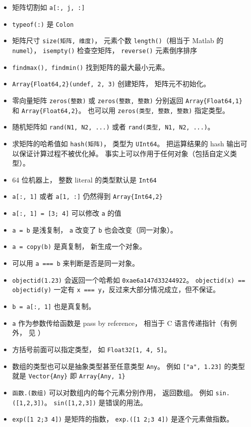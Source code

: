 \begin{itemize}
\item 矩阵切割如 \verb`a[:, j, :]`
\item \verb`typeof(:)` 是 \verb`Colon`
\item 矩阵尺寸 \verb`size(矩阵, 维度)`， 元素个数 \verb`length()`（相当于 Matlab 的 \verb`numel`）， \verb`isempty()` 检查空矩阵， \verb`reverse()` 元素倒序排序
\item \verb`findmax(), findmin()` 找到矩阵的最大最小元素。
\item \verb`Array{Float64,2}(undef, 2, 3)` 创建矩阵， 矩阵元不初始化。
\item 零向量矩阵 \verb`zeros(整数)` 或 \verb`zeros(整数, 整数)` 分别返回 \verb`Array{Float64,1}` 和 \verb`Array{Float64,2}`。 也可以用 \verb`zeros(类型, 整数, 整数)` 指定类型。
\item 随机矩阵如 \verb`rand(N1, N2, ...)` 或者 \verb`rand(类型, N1, N2, ...)`。
\item 求矩阵的哈希值如 \verb`hash(矩阵)`， 类型为 \verb`UInt64`。 把运算结果的 hash 输出可以保证计算过程不被优化掉。 事实上可以作用于任何对象（包括自定义类型）。
\item 64 位机器上， 整数 literal 的类型默认是 \verb`Int64`
\item \verb`a[:, 1]` 或者 \verb`a[1, :]` 仍然得到 \verb`Array{Int64,2}`
\item \verb`a[:, 1] = [3; 4]` 可以修改 \verb`a` 的值
\item \verb`a = b` 是浅复制， \verb`a` 改变了 \verb`b` 也会改变（同一对象）。
\item \verb`a = copy(b)` 是真复制， 新生成一个对象。
\item 可以用 \verb`a === b` 来判断是否是同一对象。
\item \verb`objectid(1.23)` 会返回一个哈希如 \verb`0xae6a147d33244922`。 \verb`objectid(x) == objectid(y)` 一定有 \verb`x === y`，反过来大部分情况成立，但不保证。
\item \verb`b = a[:, 1]` 也是真复制。
\item \verb`a` 作为参数传给函数是 pass by reference， 相当于 C 语言传递指针（有例外， 见 ）
\item 方括号前面可以指定类型， 如 \verb`Float32[1, 4, 5]`。
\item 数组的类型也可以是抽象类型甚至任意类型 \verb`Any`。 例如 \verb`["a", 1.23]` 的类型就是 \verb`Vector{Any}` 即 \verb`Array{Any, 1}`
\item \verb`函数.(数组)` 可以对数组内的每个元素分别作用， 返回数组。 例如 \verb`sin.([1,2,3])`。 \verb`sin([1,2,3])` 是错误的用法。
\item \verb`exp([1 2;3 4])` 是矩阵的指数， \verb`exp.([1 2;3 4])` 是逐个元素做指数。

\end{itemize}
